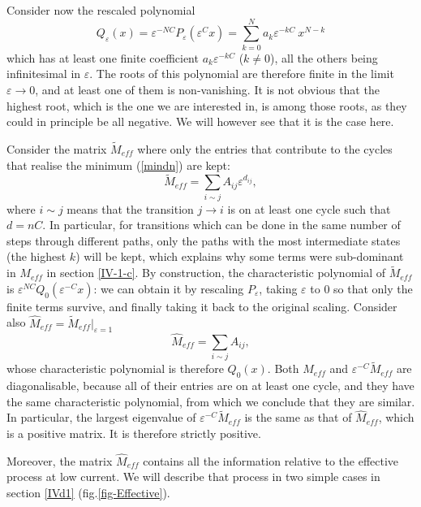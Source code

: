 \documentclass[aps,pre,onecolumn,showpacs,showkeys,a4paper]{revtex4-1}
\begin{document}
Consider now the rescaled polynomial
\begin{equation}
Q_\varepsilon(x)=\varepsilon^{-N C} P_\varepsilon(\varepsilon^{C}x)=\sum_{k=0}^{N} a_k\varepsilon^{-kC}~x^{N-k}
\end{equation}
which has at least one finite coefficient $a_k\varepsilon^{-kC}$ ($k\neq 0$), all the others being infinitesimal in $\varepsilon$. The roots of this polynomial are therefore finite in the limit $\varepsilon\rightarrow 0$, and at least one of them is non-vanishing. It is not obvious that the highest root, which is the one we are interested in, is among those roots, as they could in principle be all negative. We will however see that it is the case here.

Consider the matrix $\tilde{M}_{eff}$ where only the entries that contribute to the cycles that realise the minimum (\ref{mindn}) are kept:
\begin{equation}
\tilde{M}_{eff}=\sum\limits_{i\sim j}A_{ij}\varepsilon^{d_{ij}},
\end{equation}
where $i\sim j$ means that the transition $j\rightarrow i$ is on at least one cycle such that $d=nC$. In particular, for transitions which can be done in the same number of steps through different paths, only the paths with the most intermediate states (the highest $k$) will be kept, which explains why some terms were sub-dominant in $M_{eff}$ in section \ref{IV-1-c}. By construction, the characteristic polynomial of $\tilde{M}_{eff}$ is $\varepsilon^{N C}Q_0(\varepsilon^{-C}x)$: we can obtain it by rescaling $P_\varepsilon$, taking $\varepsilon$ to $0$ so that only the finite terms survive, and finally taking it back to the original scaling. Consider also $\hat{M}_{eff}=\tilde{M}_{eff}\big|_{\varepsilon=1}$
\begin{equation}
\hat{M}_{eff}=\sum\limits_{i\sim j}A_{ij},
\end{equation}
whose characteristic polynomial is therefore $Q_0(x)$. Both $\hat{M}_{eff}$ and $\varepsilon^{-C}\tilde{M}_{eff}$ are diagonalisable, because all of their entries are on at least one cycle, and they have the same characteristic polynomial, from which we conclude that they are similar. In particular, the largest eigenvalue of $\varepsilon^{-C}\tilde{M}_{eff}$ is the same as that of $\hat{M}_{eff}$, which is a positive matrix. It is therefore strictly positive.

Moreover, the matrix $\hat{M}_{eff}$ contains all the information relative to the effective process at low current. We will describe that process in two simple cases in section \ref{IVd1} (fig.\ref{fig-Effective}).
\end{document}
